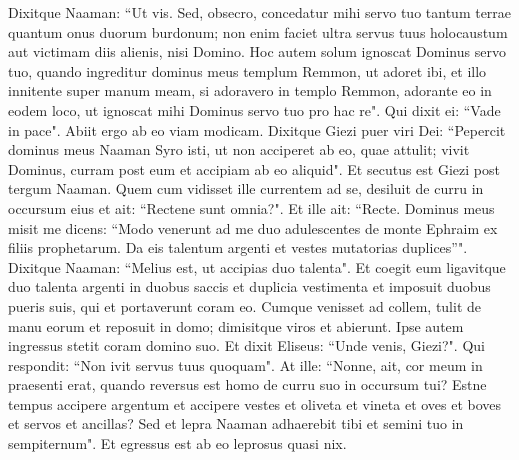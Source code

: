 \begin{biblechapter}
\verse Dixitque Naaman: “Ut vis. Sed, obsecro, concedatur mihi servo tuo tantum terrae quantum onus duorum burdonum; non enim faciet ultra servus tuus holocaustum aut victimam diis alienis, nisi Domino.  
\verse Hoc autem solum ignoscat Dominus servo tuo, quando ingreditur dominus meus templum Remmon, ut adoret ibi, et illo innitente super manum meam, si adoravero in templo Remmon, adorante eo in eodem loco, ut ignoscat mihi Dominus servo tuo pro hac re". 
\verse Qui dixit ei: “Vade in pace". Abiit ergo ab eo viam modicam. 
\verse Dixitque Giezi puer viri Dei: “Pepercit dominus meus Naaman Syro isti, ut non acciperet ab eo, quae attulit; vivit Dominus, curram post eum et accipiam ab eo aliquid". 
\verse Et secutus est Giezi post tergum Naaman. Quem cum vidisset ille currentem ad se, desiluit de curru in occursum eius et ait: “Rectene sunt omnia?". 
\verse Et ille ait: “Recte. Dominus meus misit me dicens: “Modo venerunt ad me duo adulescentes de monte Ephraim ex filiis prophetarum. Da eis talentum argenti et vestes mutatorias duplices”". 
\verse Dixitque Naaman: “Melius est, ut accipias duo talenta". Et coegit eum ligavitque duo talenta argenti in duobus saccis et duplicia vestimenta et imposuit duobus pueris suis, qui et portaverunt coram eo. 
\verse Cumque venisset ad collem, tulit de manu eorum et reposuit in domo; dimisitque viros et abierunt. 
\verse Ipse autem ingressus stetit coram domino suo. Et dixit Eliseus: “Unde venis, Giezi?". Qui respondit: “Non ivit servus tuus quoquam". 
\verse At ille: “Nonne, ait, cor meum in praesenti erat, quando reversus est homo de curru suo in occursum tui? Estne tempus accipere argentum et accipere vestes et oliveta et vineta et oves et boves et servos et ancillas? 
\verse Sed et lepra Naaman adhaerebit tibi et semini tuo in sempiternum". Et egressus est ab eo leprosus quasi nix. 
\end{biblechapter}

